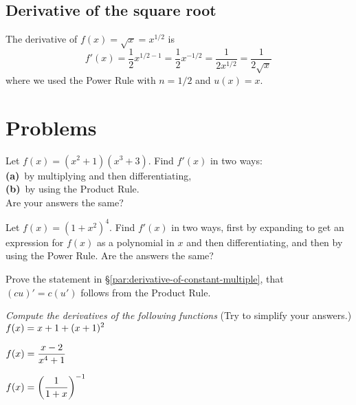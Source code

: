 \subsection{Derivative of the square root} 
The derivative of $f(x)=\sqrt{x}=x^{1/2}$ is
\[
f'(x)
= \frac12 x^{1/2 -1}
= \frac12 x^{-1/2}
= \frac1{2x^{1/2}}=\frac1{2\sqrt x}
\]
where we used the Power Rule with $n=1/2$ and $u(x)=x$.








\section{Problems} 
\problemfont 
\begin{multicols}{2}\setlength{\parindent}{0pt}
\problem Let $f(x)=(x^2+1)(x^3+3)$. Find $f'(x)$ in two ways:\\ 
\textbf{(a)}~by multiplying and then differentiating, \\
\textbf{(b)}~by using the Product Rule.\\
Are your answers the same?








\problem  Let $f(x)=(1+x^2)^4$. Find $f'(x)$ in two ways, first by 
expanding to get an expression for $f(x)$ as a polynomial in $x$ and
then differentiating, and then by using the Power Rule.  Are the
answers the same?








\problem Prove the statement in \S\ref{par:derivative-of-constant-multiple}, that $(cu)' = c(u')$ follows from the Product Rule. 








\noindent \textit{Compute the derivatives of the following functions}
(Try to simplify your answers.)\\




\problem $\displaystyle f(x) = x+1+(x+1)^2$ 




\problem $\displaystyle f(x) = \frac{x-2}{x^4+1}$ 




\problem $\displaystyle f(x) = \left(\frac{1}{1+x}\right)^{-1}$ 





\end{multicols}
